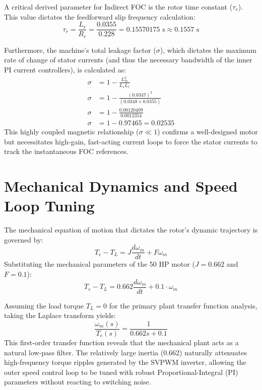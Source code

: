 \documentclass[12pt,a4paper]{report}
\begin{document}
A critical derived parameter for Indirect FOC is the rotor time constant ($\tau_r$). This value dictates the feedforward slip frequency calculation:
\begin{equation}
\tau_{r} = \frac{L_{r}}{R_{r}} = \frac{0.0355}{0.228} = 0.15570175 \text{ s} \approx 0.1557 \text{ s}
\end{equation}

Furthermore, the machine's total leakage factor ($\sigma$), which dictates the maximum rate of change of stator currents (and thus the necessary bandwidth of the inner PI current controllers), is calculated as:
\begin{align}
\sigma &= 1 - \frac{L_{m}^2}{L_{s}L_{r}} \nonumber \\
\sigma &= 1 - \frac{(0.0347)^2}{(0.0348 \times 0.0355)} \nonumber \\
\sigma &= 1 - \frac{0.00120409}{0.0012354} \nonumber \\
\sigma &= 1 - 0.97465 = 0.02535
\end{align}
This highly coupled magnetic relationship ($\sigma \ll 1$) confirms a well-designed motor but necessitates high-gain, fast-acting current loops to force the stator currents to track the instantaneous FOC references.

\section{Mechanical Dynamics and Speed Loop Tuning}
The mechanical equation of motion that dictates the rotor's dynamic trajectory is governed by:
\begin{equation}
T_{e} - T_{L} = J\frac{d\omega_{m}}{dt} + F\omega_{m}
\end{equation}
Substituting the mechanical parameters of the 50 HP motor ($J=0.662$ and $F=0.1$):
\begin{equation}
T_{e} - T_{L} = 0.662\frac{d\omega_{m}}{dt} + 0.1\cdot\omega_{m}
\end{equation}

Assuming the load torque $T_L = 0$ for the primary plant transfer function analysis, taking the Laplace transform yields:
\begin{equation}
\frac{\omega_{m}(s)}{T_{e}(s)} = \frac{1}{0.662s + 0.1}
\end{equation}
This first-order transfer function reveals that the mechanical plant acts as a natural low-pass filter. The relatively large inertia ($0.662$) naturally attenuates high-frequency torque ripples generated by the SVPWM inverter, allowing the outer speed control loop to be tuned with robust Proportional-Integral (PI) parameters without reacting to switching noise.
\end{document}
